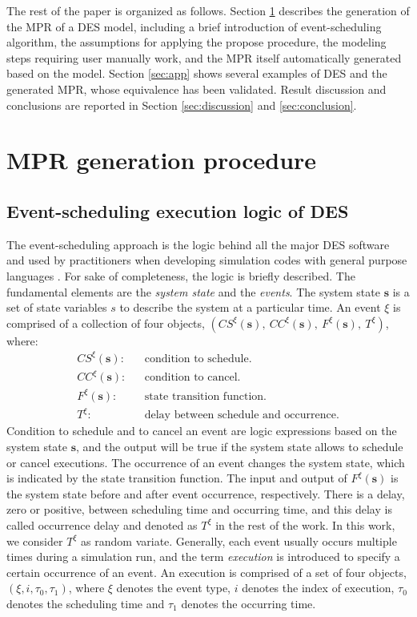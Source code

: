 \documentclass[]{interact}
\theoremstyle{plain}%
\theoremstyle{definition}
\theoremstyle{remark}
\begin{document}
The rest of the paper is organized as follows. Section \ref{sec:MPR} describes the generation of the MPR of a DES model, including a brief introduction of event-scheduling algorithm, the assumptions for applying the propose procedure, the modeling steps requiring user manually work, and the MPR itself automatically generated based on the model. Section \ref{sec:app} shows several examples of DES and the generated MPR, whose equivalence has been validated. Result discussion and conclusions are reported in Section \ref{sec:discussion} and \ref{sec:conclusion}.


\section{MPR generation procedure} \label{sec:MPR}
\subsection{Event-scheduling execution logic of DES } \label{sec:SimAlgo}
The event-scheduling approach is the logic behind all the major DES software and used by practitioners when developing simulation codes with general purpose languages \citep{law2014simulation}. For sake of completeness, the logic is briefly described. The fundamental elements are the \textit{system state} and the \textit{events}. The system state $\textbf{s}$ is a set of state variables $s$ to describe the system at a particular time. An event $\xi$ is comprised of a collection of four objects, $(CS^{\xi}(\textbf{s}),\ CC^{\xi}(\textbf{s}),\ F^{\xi}(\textbf{s}),\ T^{\xi})$, where:
\begin{eqnarray}
CS^{\xi}(\textbf{s}): && \text{condition to schedule.}\nonumber\\
CC^{\xi}(\textbf{s}): && \text{condition to cancel.}\nonumber\\
F^{\xi}(\textbf{s}): && \text{state transition function.}\nonumber\\
T^{\xi}: && \text{delay between schedule and occurrence.}\nonumber
\end{eqnarray}
Condition to schedule and to cancel an event are logic expressions based on the system state $\textbf{s}$, and the output will be true if the system state allows to schedule or cancel executions. The occurrence of an event changes the system state, which is indicated by the state transition function. The input and output of $F^{\xi}(\textbf{s})$ is the system state before and after event occurrence, respectively. There is a delay, zero or positive, between scheduling time and occurring time, and this delay is called occurrence delay and denoted as $T^{\xi}$ in the rest of the work. In this work, we consider $T^{\xi}$ as random variate. Generally, each event usually occurs multiple times during a simulation run, and the term \textit{execution} is introduced to specify a certain occurrence of an event. An execution is comprised of a set of four objects, $(\xi,i,\tau_0,\tau_1)$, where $\xi$ denotes the event type, $i$ denotes the index of execution, $\tau_0$ denotes the scheduling time and $\tau_1$ denotes the occurring time. 
\end{document}
